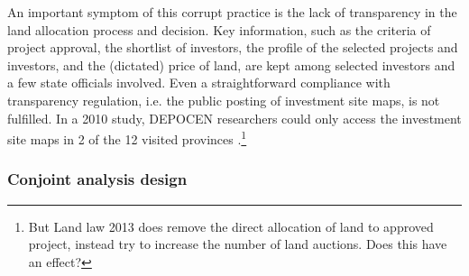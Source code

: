 An important symptom of this corrupt practice is the lack of transparency in the land allocation process and decision. Key information, such as the criteria of project approval, the shortlist of investors, the profile of the selected projects and investors, and the (dictated) price of land, are kept among selected investors and a few state officials involved. Even a straightforward compliance with transparency regulation, i.e. the public posting of investment site maps, is not fulfilled. In a 2010 study, DEPOCEN researchers could only access the investment site maps in 2 of the 12 visited provinces \citep{Anderson2011}.\footnote{But Land law 2013 does remove the direct allocation of land to approved project, instead try to increase the number of land auctions. Does this have an effect?}

\subsubsection{Conjoint analysis design}

